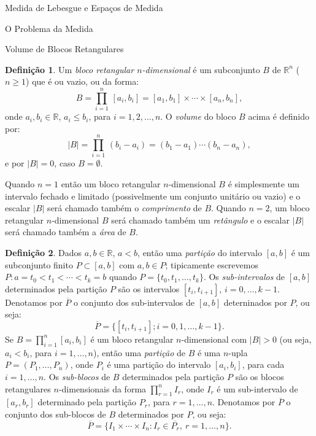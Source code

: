 \documentclass[oneside,final,11pt]{amsbook}
\newcommand{\R}{\mathds R}
\theoremstyle{remark}\newtheorem{exercise}{Exercício}[chapter]
\theoremstyle{remark}\newtheorem{*exercise}[exercise]{\hbox to 0pt{\hskip 0pt minus 1fil*}Exercício}
\theoremstyle{definition}\newtheorem{exdefin}{Definição}[chapter]
\theoremstyle{plain}\newtheorem{teo}{Teorema}[section]
\theoremstyle{plain}\newtheorem{lem}[teo]{Lema}
\theoremstyle{plain}\newtheorem{prop}[teo]{Proposição}
\theoremstyle{plain}\newtheorem{cor}[teo]{Corolário}
\theoremstyle{definition}\newtheorem{defin}[teo]{Definição}
\theoremstyle{remark}\newtheorem{rem}[teo]{Observação}
\theoremstyle{definition}\newtheorem{notation}[teo]{Notação}
\theoremstyle{definition}\newtheorem{convention}[teo]{Convenção}
\theoremstyle{definition}\newtheorem{example}[teo]{Exemplo}
\numberwithin{section}{chapter}
\numberwithin{equation}{section}
\begin{document}
\begin{chapter}{Medida de Lebesgue e Espaços de Medida}
\begin{section}{O Problema da Medida}
\end{section}

\begin{section}{Volume de Blocos Retangulares}

\begin{defin}\label{thm:defbloco}
Um {\em bloco retangular $n$-dimensional\/}
é um subconjunto $B$ de $\R^n$ ($n\ge1$) que é ou vazio, ou da forma:
\[B=\prod_{i=1}^n\,[a_i,b_i]=[a_1,b_1]\times\cdots\times[a_n,b_n],\]
onde $a_i,b_i\in\R$, $a_i\le b_i$, para $i=1,2,\ldots,n$. O {\em volume\/}
do bloco $B$ acima é definido por:
\[\vert B\vert=\prod_{i=1}^n\,(b_i-a_i)=(b_1-a_1)\cdots(b_n-a_n),\]
e por $\vert B\vert=0$, caso $B=\emptyset$.
\end{defin}
Quando $n=1$ então um bloco retangular $n$-dimensional $B$ é simplesmente um intervalo
fechado e limitado (possivelmente um conjunto unitário ou vazio) e o escalar $\vert B\vert$ será
chamado também o {\em comprimento\/} de $B$.
Quando $n=2$, um bloco retangular $n$-dimensional $B$ será chamado também um {\em retângulo\/} e o
escalar $\vert B\vert$ será chamado também a
{\em área\/} de $B$.

\begin{defin}\label{thm:defcoisasbloco}
Dados $a,b\in\R$, $a<b$, então uma {\em partição\/} do intervalo $[a,b]$ é um subconjunto finito $P\subset[a,b]$
com $a,b\in P$; tipicamente escrevemos $P:a=t_0<t_1<\cdots<t_k=b$ quando $P=\{t_0,t_1,\ldots,t_k\}$. Os
{\em sub-intervalos\/}
de $[a,b]$ determinados pela partição $P$ são os intervalos $[t_i,t_{i+1}]$, $i=0,\ldots,k-1$. Denotamos
por $\overline P$ o conjunto dos sub-intervalos de $[a,b]$ deterninados por $P$, ou seja:
\[\overline P=\big\{[t_i,t_{i+1}];i=0,1,\ldots,k-1\big\}.\]
Se $B=\prod_{i=1}^n[a_i,b_i]$ é um bloco retangular $n$-dimensional com $\vert B\vert>0$ (ou seja,
$a_i<b_i$, para $i=1,\ldots,n$), então uma {\em partição\/}
de $B$ é uma $n$-upla $P=(P_1,\ldots,P_n)$, onde $P_i$ é uma partição do intervalo $[a_i,b_i]$, para cada $i=1,\ldots,n$.
Os {\em sub-blocos\/}
de $B$ determinados pela partição $P$ são os blocos retangulares $n$-dimensionais da forma $\prod_{r=1}^nI_r$,
onde $I_r$ é um sub-intervalo de $[a_r,b_r]$ determinado pela partição $P_r$, para $r=1,\ldots,n$. Denotamos por $\overline P$
o conjunto dos sub-blocos de $B$ determinados por $P$, ou seja:
\[\overline P=\big\{I_1\times\cdots\times I_n:I_r\in\overline{P_r},\ r=1,\ldots,n\big\}.\]
\end{defin}


\end{section}
\end{chapter}
\end{document}
